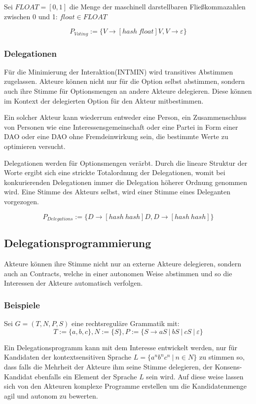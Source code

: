 \documentclass[a4paper,12pt]{report}
\begin{document}
Sei $FLOAT = [0,1]$ die Menge der maschinell darstellbaren Fließkommazahlen zwischen 0 und 1: $float\in FLOAT$

\[ P_{Voting} := \{V\rightarrow [hash\ float]V, V \rightarrow \varepsilon\} \] 
  


\subsubsection*{Delegationen}

Für die Minimierung der Interaktion(INTMIN) wird transitives Abstimmen zugelassen. Akteure können nicht nur für die Option selbst abstimmen, sondern auch ihre Stimme für Optionsmengen an andere Akteure delegieren. Diese können im Kontext der delegierten Option für den Akteur mitbestimmen.

Ein solcher Akteur kann wiederrum entweder eine Person, ein Zusammenschluss von Personen wie eine Interessensgemeinschaft oder eine Partei in Form einer DAO oder eine DAO ohne Fremdeinwirkung sein, die bestimmte Werte zu optimieren versucht.

Delegationen werden für Optionsmengen verärbt. Durch die lineare Struktur der Worte ergibt sich eine strickte Totalordnung der Delegationen, womit bei konkurierenden Delegationen immer die Delegation höherer Ordnung genommen wird. Eine Stimme des Akteurs selbst, wird einer Stimme eines Deleganten vorgezogen.

\[ P_{Delegations} := \{D\rightarrow [hash\ hash]D,D\rightarrow [hash\ hash]\} \] 


\subsection{Delegationsprogrammierung}
Akteure können ihre Stimme nicht nur an externe Akteure delegieren, sondern auch an Contracts, welche in einer autonomen Weise abstimmen und so die Interessen der Akteure automatisch verfolgen. 

\subsubsection*{Beispiele}

Sei $G=(T,N,P,S)$ eine rechtsreguläre Grammatik mit:
\[ T:=\{ a, b, c \}, N:=\{S\}, P:= \{S\rightarrow aS\ |\ bS\ |\ cS\ |\ \varepsilon \} \] 

Ein Delegationsprogramm kann mit dem Interesse entwickelt werden, nur für Kandidaten der kontextsensitiven Sprache $L = \{ a^nb^nc^n\ |\ n\in N\}$ zu stimmen so, dass falls die Mehrheit der Akteure ihm seine Stimme delegieren, der Konsens-Kandidat ebenfalls ein Element der Sprache $L$ sein wird. Auf diese weise lassen sich von den Akteuren komplexe Programme erstellen um die Kandidatenmenge agil und autonom zu bewerten.
\end{document}
